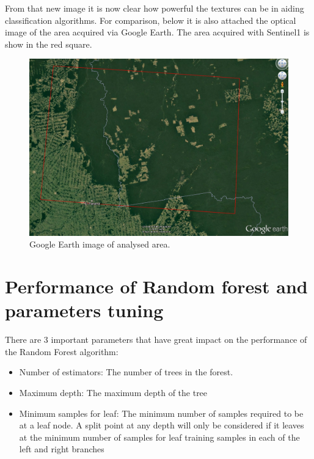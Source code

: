 From that new image it is now clear how powerful the textures can be in aiding classification algorithms.
For comparison, below it is also attached the optical image of the area acquired via Google Earth. The area acquired with Sentinel1 is show in the red square.

\begin{figure}[H]
    \centering
    \includegraphics[width=\linewidth]{Chapter5/real_image_google_earth.pdf}
    \caption{Google Earth image of analysed area.}
    \label{fig:google_earth_area_sentinel1}
\end{figure}{}

\section{Performance of Random forest and parameters tuning}
There are 3 important parameters that have great impact on the performance of the Random Forest algorithm:
\begin{itemize}
    \item Number of estimators: The number of trees in the forest.
    \item Maximum depth: The maximum depth of the tree
    \item Minimum samples for leaf: The minimum number of samples required to be at a leaf node. A split point at any depth will only be considered if it leaves at the minimum number of samples for leaf training samples in each of the left and right branches
\end{itemize}{}

